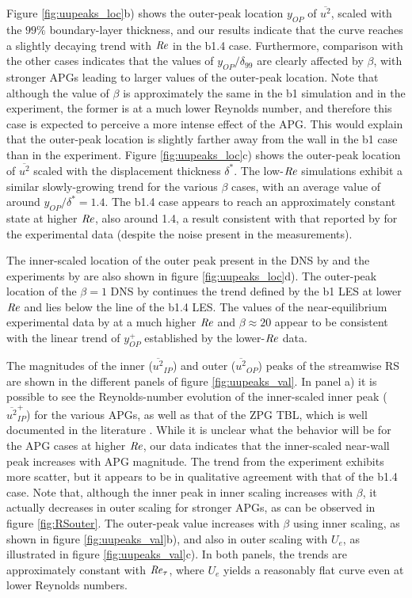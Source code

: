Figure \ref{fig:uupeaks_loc}b) shows the outer-peak location $y_{OP}$ of $\overline{u^2}$, scaled with the $99\%$ boundary-layer thickness, and our results indicate that the curve reaches a slightly decaying trend with $\mbox{\textit{Re}}$ in the b1.4 case. 
Furthermore, comparison with the other cases indicates that the values of $y_{OP}/\delta_{99}$ are clearly affected by $\beta$, with stronger APGs leading to larger values of the outer-peak location. Note that although the value of $\beta$ is approximately the same in the b1 simulation and in the experiment, the former is at a much lower Reynolds number, and therefore this case is expected to perceive a more intense effect of the APG. This would explain that the outer-peak location is slightly farther away from the wall in the b1 case than in the experiment.
Figure \ref{fig:uupeaks_loc}c) shows the outer-peak location of $\overline{u^2}$ scaled with the displacement thickness $\delta^*$. The low-$\mbox{\textit{Re}}$ simulations exhibit a similar slowly-growing trend for the various $\beta$ cases, with an average value of around $y_{OP}/\delta^* = 1.4$. The b1.4 case appears to reach an approximately constant state at higher $\mbox{\textit{Re}}$, also around 1.4, a result consistent with that reported by \cite{Sanmiguel_PRF} for the experimental data (despite the noise present in the measurements).

The inner-scaled location of the outer peak present in the DNS by \cite{Kitsios2016} and the experiments by \cite{skare_krogstad_1994} are also shown in figure \ref{fig:uupeaks_loc}d). The outer-peak location of the $\beta=1$ DNS by \cite{Kitsios2016} continues the trend defined by the b1 LES at lower $\mbox{\textit{Re}}$ and lies below the line of the b1.4 LES. The values of the near-equilibrium experimental data by \cite{skare_krogstad_1994} at a much higher $\mbox{\textit{Re}}$ and $\beta \approx 20$ appear to be consistent with the linear trend of $y_{OP}^+$ established by the lower-$\mbox{\textit{Re}}$ data.


The magnitudes of the inner ($\overline{u^2}_{IP}$) and outer ($\overline{u^2}_{OP}$) peaks of the streamwise RS are shown in the different panels of figure \ref{fig:uupeaks_val}.
In panel a) it is possible to see the Reynolds-number evolution of the inner-scaled inner peak ($\overline{u^2}_{IP}^+$) for the various APGs, as well as that of the ZPG TBL, which is well documented in the literature \citep{E-AmorZPG, Marusic_1997_ZPG}. While it is unclear what the behavior will be for the APG cases at higher $\mbox{\textit{Re}}$, our data indicates that the inner-scaled near-wall peak increases with APG magnitude. The trend from the experiment exhibits more scatter, but it appears to be in qualitative agreement with that of the b1.4 case. Note that, although the inner peak in inner scaling increases with $\beta$, it actually decreases in outer scaling for stronger APGs, as can be observed in figure \ref{fig:RSouter}.
The outer-peak value increases with $\beta$ using inner scaling, as shown in figure \ref{fig:uupeaks_val}b), and also in outer scaling with $U_e$, as illustrated in figure \ref{fig:uupeaks_val}c). In both panels, the trends are approximately constant with $\mbox{\textit{Re}}_{\tau}$, where $U_{e}$ yields a reasonably flat curve even at lower Reynolds numbers. 


